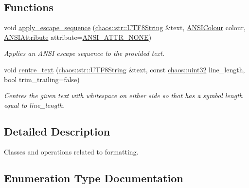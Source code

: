 \subsection*{Functions}
\begin{DoxyCompactItemize}
\item 
void \hyperlink{namespacechaos_1_1io_1_1format_a005869cc85ba6d9b0fcfad31cf56bda7}{apply\+\_\+escape\+\_\+sequence} (\hyperlink{classchaos_1_1str_1_1_u_t_f8_string}{chaos\+::str\+::\+U\+T\+F8\+String} \&text, \hyperlink{namespacechaos_1_1io_1_1format_aa30dcff2478ffc94e33504c8886a5b1a}{A\+N\+S\+I\+Colour} colour, \hyperlink{namespacechaos_1_1io_1_1format_af01119682ec0bc616b49641e0c2a7ccf}{A\+N\+S\+I\+Attribute} attribute=\hyperlink{namespacechaos_1_1io_1_1format_af01119682ec0bc616b49641e0c2a7ccfa3154b286513beb167bb516ea15f1cfb5}{A\+N\+S\+I\+\_\+\+A\+T\+T\+R\+\_\+\+N\+O\+N\+E})
\begin{DoxyCompactList}\small\item\em Applies an A\+N\+S\+I escape sequence to the provided text. \end{DoxyCompactList}\item 
void \hyperlink{namespacechaos_1_1io_1_1format_a626396566ef32d2401d4a0e91594a4a2}{centre\+\_\+text} (\hyperlink{classchaos_1_1str_1_1_u_t_f8_string}{chaos\+::str\+::\+U\+T\+F8\+String} \&text, const \hyperlink{namespacechaos_a3b3a47ba1e284655bf1a30c441121c60}{chaos\+::uint32} line\+\_\+length, bool trim\+\_\+trailing=false)
\begin{DoxyCompactList}\small\item\em Centres the given text with whitespace on either side so that has a symbol length equal to line\+\_\+length. \end{DoxyCompactList}\end{DoxyCompactItemize}


\subsection{Detailed Description}
Classes and operations related to formatting. 

\subsection{Enumeration Type Documentation}
\hypertarget{namespacechaos_1_1io_1_1format_af01119682ec0bc616b49641e0c2a7ccf}{}
